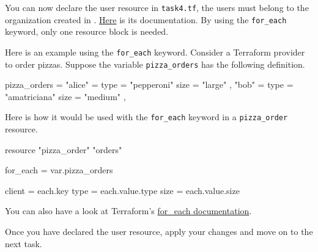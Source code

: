 You can now declare the user resource in \texttt{task4.tf}, the users must belong to the organization created in .
\href{https://registry.terraform.io/providers/itera-io/taikun/latest/docs/resources/user}{Here} is its documentation.
By using the \texttt{for\_each} keyword, only one resource block is needed.

\begin{tip}
  Here is an example using the \texttt{for\_each} keyword.
  Consider a Terraform provider to order pizzas.
  Suppose the variable \texttt{pizza\_orders} has the following definition.
  \begin{tf}
pizza_orders = {
  "alice" = {
    type = "pepperoni"
    size = "large"
  },
  "bob" = {
    type = "amatriciana"
    size = "medium"
  },
}
  \end{tf}
  Here is how it would be used with the \texttt{for\_each} keyword in a \texttt{pizza\_order} resource.
  \begin{tf}
resource "pizza_order" "orders" {
  for_each = var.pizza_orders

  client = each.key
  type   = each.value.type
  size   = each.value.size
}
  \end{tf}

  You can also have a look at Terraform's \href{https://www.terraform.io/docs/language/meta-arguments/for_each.html}{for\_each documentation}.
\end{tip}

Once you have declared the user resource, apply your changes and move on to the next task.
